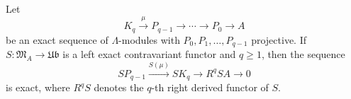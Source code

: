 Let
$$K_q \xrightarrow{\mu} P_{q-1} \rightarrow \cdots \rightarrow P_0 \rightarrow A$$
be an exact sequence of $\Lambda$-modules with $P_0, P_1, \ldots, P_{q-1}$ projective. If $S : \mathfrak{M}_A \rightarrow \mathfrak{Ub}$ is a left exact contravariant functor and $q \geq 1$, then the sequence
$$SP_{q-1} \xrightarrow{S(\mu)} SK_q \rightarrow R^q SA \rightarrow 0$$
is exact, where $R^q S$ denotes the $q$-th right derived functor of $S$.
